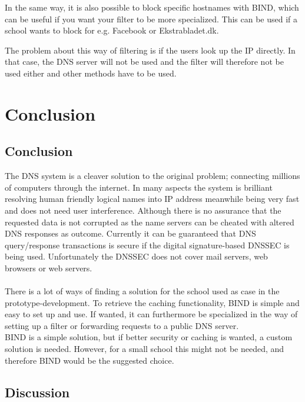 \documentclass[a4paper,10pt]{report}
\begin{document}
In the same way, it is also possible to block specific hostnames with BIND, which can be useful if you want your filter to be more specialized. 
This can be used if a school wants to block for e.g. Facebook or Ekstrabladet.dk.

The problem about this way of filtering is if the users look up the IP directly. 
In that case, the DNS server will not be used and the filter will therefore not be used either and other methods have to be used.

\chapter{Conclusion}

\section{Conclusion}

The DNS system is a cleaver solution to the original problem; connecting millions of computers through the internet.
In many aspects the system is brilliant resolving human friendly logical names into IP address meanwhile being very fast and does not need user interference. Although there is no assurance that the requested data is not corrupted as the name servers can be cheated with altered DNS responses as outcome. Currently it can be guaranteed that DNS query/response transactions is secure if the digital signature-based DNSSEC is being used. Unfortunately the DNSSEC does not cover mail servers, web browsers or web servers.
\\
\\
There is a lot of ways of finding a solution for the school used as case in the prototype-development.
To retrieve the caching functionality, BIND is simple and easy to set up and use. 
If wanted, it can furthermore be specialized in the way of setting up a filter or forwarding requests to a public DNS server.  
\\
BIND is a simple solution, but if better security or caching is wanted, a custom solution is needed. However, for a small school this might not be needed, and therefore BIND would be the suggested choice.


\section{Discussion}
\end{document}
